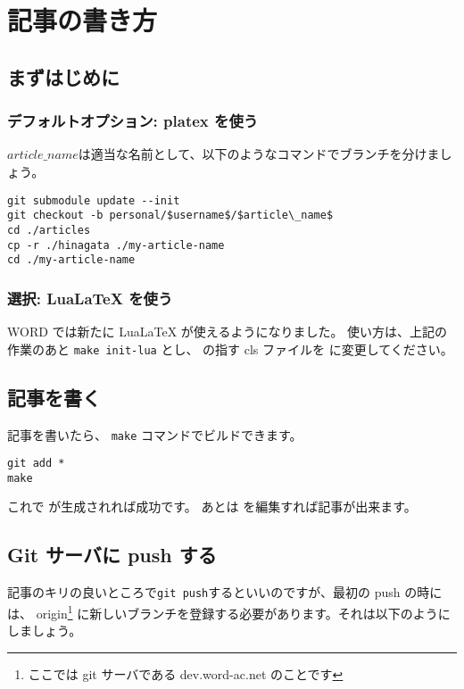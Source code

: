 \documentclass{word}
\subtitle{ヘッダの見出し}
\author{ほげ}
\begin{document}
\chapter{記事の書き方}

\section{まずはじめに}

\subsection{デフォルトオプション: platex を使う}

$article\_name$は適当な名前として、以下のようなコマンドでブランチを分けましょう。

\begin{lstlisting}[mathescape]
git submodule update --init
git checkout -b personal/$username$/$article\_name$
cd ./articles
cp -r ./hinagata ./my-article-name
cd ./my-article-name
\end{lstlisting}

\subsection{選択: LuaLaTeX を使う}

WORD では新たに LuaLaTeX が使えるようになりました。
使い方は、上記の作業のあと \lstinline|make init-lua| とし、  の指す cls ファイルを  に変更してください。

\section{記事を書く}

記事を書いたら、 \lstinline|make| コマンドでビルドできます。

\begin{lstlisting}
git add *
make
\end{lstlisting}

これで が生成されれば成功です。
あとは を編集すれば記事が出来ます。

\section{Git サーバに push する}

記事のキリの良いところで\lstinline|git push|するといいのですが、最初の push の時には、
origin\footnote{ここでは git サーバである dev.word-ac.net のことです}
に新しいブランチを登録する必要があります。それは以下のようにしましょう。
\end{document}

